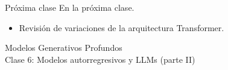\documentclass{beamer}
\begin{document}
\begin{frame}{Próxima clase}
    En la próxima clase.
    \begin{itemize}
        \item Revisión de variaciones de la arquitectura Transformer.
    \end{itemize}
\end{frame}

\begin{frame}
    \centering
    \Large{Modelos Generativos Profundos}\\
    \large{Clase 6: Modelos autorregresivos y LLMs (parte II)}
\end{frame}
\end{document}
